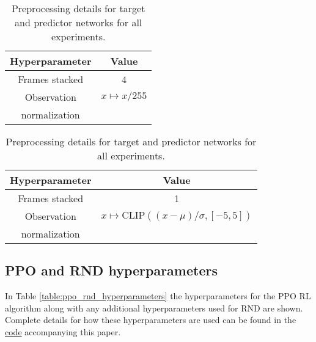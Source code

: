 \documentclass{article} \usepackage[dvipsnames]{xcolor}
\begin{document}
\begin{table}
\begin{minipage}[t]{0.48\textwidth}
\centering
\begin{tabular}{c | c} 
 Hyperparameter & Value  \\ [0.5ex] 
 \hline
 Frames stacked & 4  \\
 Observation & $x \mapsto x / 255$ \\ 
 normalization &  \\[1ex] 
\end{tabular}
\caption{Preprocessing details for policy and value network for all experiments.}
\label{table:preprocessing_policy}
\end{minipage}\hspace{0.5em}
\begin{minipage}[t]{0.48\textwidth}
\centering
\begin{tabular}{c | c} 
 Hyperparameter & Value  \\ [0.5ex] 
 \hline
 Frames stacked & 1  \\
 Observation & $x \mapsto \text{CLIP}\left((x - \mu) / \sigma, [-5, 5]\right)$ \\
 normalization & \\[1ex] 
\end{tabular}
\caption{Preprocessing details for target and predictor networks for all experiments.}
\label{table:preprocessing_predictor}
\end{minipage}
\end{table}

\subsection{PPO and RND hyperparameters}
\label{sec:ppornd_hyperparams}
In Table \ref{table:ppo_rnd_hyperparameters} the hyperparameters for the PPO RL algorithm along with any additional hyperparameters used for RND are shown. Complete details for how these hyperparameters are used can be found in the \href{https://github.com/openai/random-network-distillation}{code} accompanying this paper.
\end{document}
